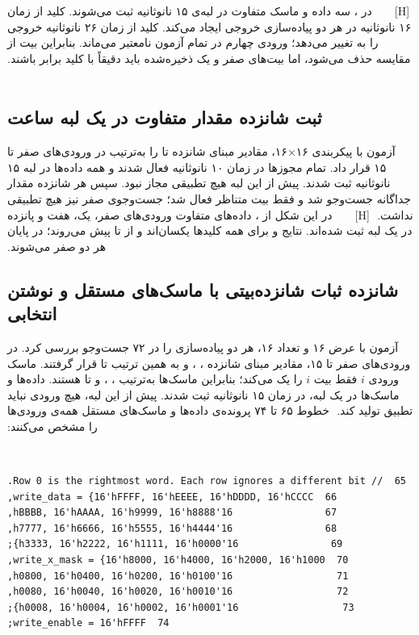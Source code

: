 ‫
‫[H]
‫
‫
‫
‫
‫
‫در ، سه داده و ماسک متفاوت در لبه‌ی ۱۵ نانوثانیه
‫ثبت می‌شوند. کلید  از زمان ۱۶ نانوثانیه در هر دو پیاده‌سازی
‫خروجی  ایجاد می‌کند. کلید  از زمان ۲۶ نانوثانیه خروجی
‫را به  تغییر می‌دهد؛ ورودی چهارم در تمام آزمون نامعتبر می‌ماند.
‫بنابراین بیت  از مقایسه حذف می‌شود، اما بیت‌های صفر و یک ذخیره‌شده
‫باید دقیقاً با کلید برابر باشند.
‫
‫\subsection{ثبت شانزده مقدار متفاوت در یک لبه ساعت}
‫
‫آزمون  با پیکربندی ۱۶×۱۶، مقادیر مبنای شانزده  تا  را به‌ترتیب در ورودی‌های صفر تا ۱۵ قرار داد. تمام مجوزها در زمان ۱۰ نانوثانیه فعال شدند و همه داده‌ها در لبه ۱۵ نانوثانیه ثبت شدند. پیش از این لبه هیچ تطبیقی مجاز نبود. سپس هر شانزده مقدار جداگانه جست‌وجو شد و فقط بیت متناظر فعال شد؛ جست‌وجوی صفر نیز هیچ تطبیقی نداشت.
‫
‫[H]
‫
‫
‫
‫
‫
‫در این شکل از ، داده‌های متفاوت ورودی‌های صفر، یک، هفت و پانزده در یک لبه ثبت شده‌اند. نتایج  و  برای همه کلیدها یکسان‌اند و از  تا  پیش می‌روند؛ در پایان هر دو صفر می‌شوند.
‫
‫\subsection{شانزده ثبات شانزده‌بیتی با ماسک‌های مستقل و نوشتن انتخابی}
‫
‫آزمون  با عرض ۱۶ و تعداد ۱۶، هر دو پیاده‌سازی را در ۷۲ جست‌وجو بررسی کرد. در ورودی‌های صفر تا ۱۵، مقادیر مبنای شانزده ، ،  و به همین ترتیب تا  قرار گرفتند. ماسک ورودی $i$ فقط بیت $i$ را یک می‌کند؛ بنابراین ماسک‌ها به‌ترتیب ، ،  و تا  هستند. داده‌ها و ماسک‌ها در یک لبه، در زمان ۱۵ نانوثانیه ثبت شدند. پیش از این لبه، هیچ ورودی نباید تطبیق تولید کند.
‫
‫خطوط ۶۵ تا ۷۴ پرونده‌ی  داده‌ها و ماسک‌های مستقل همه‌ی ورودی‌ها را مشخص می‌کنند:
‫
‫\begin{dsdlcodeblock}
‫\begin{verbatim}
‫65  // Row 0 is the rightmost word. Each row ignores a different bit.
‫66  write_data = {16'hFFFF, 16'hEEEE, 16'hDDDD, 16'hCCCC,
‫67                16'hBBBB, 16'hAAAA, 16'h9999, 16'h8888,
‫68                16'h7777, 16'h6666, 16'h5555, 16'h4444,
‫69                16'h3333, 16'h2222, 16'h1111, 16'h0000};
‫70  write_x_mask = {16'h8000, 16'h4000, 16'h2000, 16'h1000,
‫71                  16'h0800, 16'h0400, 16'h0200, 16'h0100,
‫72                  16'h0080, 16'h0040, 16'h0020, 16'h0010,
‫73                  16'h0008, 16'h0004, 16'h0002, 16'h0001};
‫74  write_enable = 16'hFFFF;
‫\end{verbatim}
‫\end{dsdlcodeblock}
